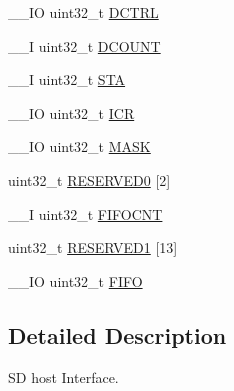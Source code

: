 \begin{DoxyCompactItemize}
\item 
\-\_\-\-\_\-\-I\-O uint32\-\_\-t \hyperlink{struct_s_d_i_o___type_def_a96a3d1a050982fccc23c2e6dbe0de068}{D\-C\-T\-R\-L}
\item 
\-\_\-\-\_\-\-I uint32\-\_\-t \hyperlink{struct_s_d_i_o___type_def_a4273e2b5aeb7bdf1006909b1a2b59bc8}{D\-C\-O\-U\-N\-T}
\item 
\-\_\-\-\_\-\-I uint32\-\_\-t \hyperlink{struct_s_d_i_o___type_def_a7520cdf6f3df68c2f147bdd87fb8a96f}{S\-T\-A}
\item 
\-\_\-\-\_\-\-I\-O uint32\-\_\-t \hyperlink{struct_s_d_i_o___type_def_a0a8c8230846fd8ff154b9fde8dfa0399}{I\-C\-R}
\item 
\-\_\-\-\_\-\-I\-O uint32\-\_\-t \hyperlink{struct_s_d_i_o___type_def_a5c955643593b4aedbe9f84f054d26522}{M\-A\-S\-K}
\item 
uint32\-\_\-t \hyperlink{struct_s_d_i_o___type_def_a8be676577db129a84a9a2689519a8502}{R\-E\-S\-E\-R\-V\-E\-D0} \mbox{[}2\mbox{]}
\item 
\-\_\-\-\_\-\-I uint32\-\_\-t \hyperlink{struct_s_d_i_o___type_def_ab27b78e19f487c845437c29812eecca7}{F\-I\-F\-O\-C\-N\-T}
\item 
uint32\-\_\-t \hyperlink{struct_s_d_i_o___type_def_a2d531df35272b1f3d787e5726ed5c52c}{R\-E\-S\-E\-R\-V\-E\-D1} \mbox{[}13\mbox{]}
\item 
\-\_\-\-\_\-\-I\-O uint32\-\_\-t \hyperlink{struct_s_d_i_o___type_def_a68bef1da5fd164cf0f884b4209670dc8}{F\-I\-F\-O}
\end{DoxyCompactItemize}


\subsection{Detailed Description}
S\-D host Interface. 

